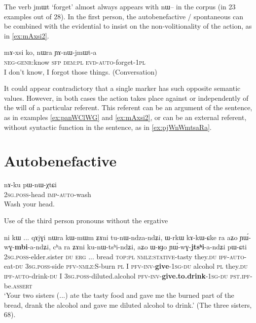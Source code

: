 \documentclass[oldfontcommands,oneside,a4paper,11pt]{article}
\newcommand{\ipa}[1]{{\phon \mbox{#1}}} %
\begin{document}
The verb \ipa{jmɯt} `forget' almost always appears with \ipa{nɯ--} in the corpus (in 23 examples out of 28). In the first person, the autobenefactive / spontaneous can be combined with the evidential to insist on the non-volitionality of the action, as in  \ref{ex:mAxsi2}.

\begin{exe}
 \ex \label{ex:mAxsi2}
 \gll
\ipa{mɤ-xsi}  	\ipa{ko,}  	\ipa{nɯra}  	\ipa{ɲɤ-nɯ-jmɯt-a}  \\
\textsc{neg-genr}:know \textsc{sfp} \textsc{dem:pl} \textsc{evd-auto}-forget-\textsc{1pl} \\
\glt I don't know, I forgot those things. (Conversation)
\end{exe}

It could appear contradictory that a single marker has such opposite semantic values. However, in both cases the action takes place against or independently of the will of a particular referent. This referent can be an argument of the sentence, as in examples \ref{ex:panWClWG} and \ref{ex:mAxsi2}, or can be an external referent, without syntactic function in the sentence, as in \ref{ex:pjWnWmtsaRa}. 

 
\section{Autobenefactive}

\begin{exe}
\ex
\gll 
\ipa{nɤ-ku} 	\ipa{pɯ-nɯ-χtɕi} \\
\textsc{2sg.poss}-head \textsc{imp-auto}-wash \\
\glt Wash your head.
\end{exe}

Use of the third person pronouns without the ergative

   \begin{exe}
\ex \label{ex:tunWndzandZi}
\gll  \ipa{nɤ-pi}   	\ipa{ni}   	\ipa{kɯ}   	...   	\ipa{qɤjɣi}   	\ipa{nɯra}   	\ipa{kɯ-mɯm}   	\ipa{ʑɤni}   	\ipa{tu-nɯ-ndza-ndʑi,}   	\ipa{ɯ-rkɯ}   	\ipa{kɤ-kɯ-ɕke}   	\ipa{ra}   	\ipa{aʑo}   	\ipa{ɲɯ́-wɣ-\textbf{mbi}-a-ndʑi,}   	\ipa{cʰa}   	\ipa{ra}   	\ipa{ʑɤni}   	\ipa{ku-nɯ-tsʰi-ndʑi,}   	\ipa{aʑo}   	\ipa{ɯ-ʁɟo}   	\ipa{ɲɯ́-wɣ-\textbf{jtsʰi}-a-ndʑi}   	\ipa{pɯ-ɕti}        \\
\textsc{2sg.poss}-elder.sister \textsc{du} \textsc{erg} ... bread \textsc{top:pl} \textsc{nmlz:stative}-tasty they.\textsc{du} \textsc{ipf}-\textsc{auto}-eat-\textsc{du} \textsc{3sg.poss}-side \textsc{pfv}-\textsc{nmlz:S}-burn \textsc{pl}  I \textsc{pfv}-\textsc{inv}-\textbf{give}-\textsc{1sg}-\textsc{du} alcohol \textsc{pl} they.\textsc{du} \textsc{ipf}-\textsc{auto}-drink-\textsc{du} I \textsc{3sg.poss}-diluted.alcohol \textsc{pfv}-\textsc{inv}-\textbf{give.to.drink}-\textsc{1sg}-\textsc{du} \textsc{pst.ipf}-be.\textsc{assert}  \\
 \glt    `Your two sisters (...) ate the tasty food and gave me the burned part of the bread, drank the alcohol and gave me diluted alcohol to drink.'  (The three sisters, 68).
\end{exe} 
\end{document}
